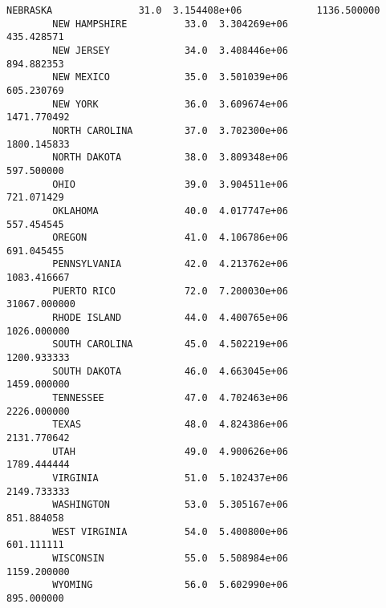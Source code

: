 \documentclass[11pt]{article}
\begin{document}
\begin{Verbatim}[commandchars=\\\{\}]
        NEBRASKA               31.0  3.154408e+06             1136.500000   
        NEW HAMPSHIRE          33.0  3.304269e+06              435.428571   
        NEW JERSEY             34.0  3.408446e+06              894.882353   
        NEW MEXICO             35.0  3.501039e+06              605.230769   
        NEW YORK               36.0  3.609674e+06             1471.770492   
        NORTH CAROLINA         37.0  3.702300e+06             1800.145833   
        NORTH DAKOTA           38.0  3.809348e+06              597.500000   
        OHIO                   39.0  3.904511e+06              721.071429   
        OKLAHOMA               40.0  4.017747e+06              557.454545   
        OREGON                 41.0  4.106786e+06              691.045455   
        PENNSYLVANIA           42.0  4.213762e+06             1083.416667   
        PUERTO RICO            72.0  7.200030e+06            31067.000000   
        RHODE ISLAND           44.0  4.400765e+06             1026.000000   
        SOUTH CAROLINA         45.0  4.502219e+06             1200.933333   
        SOUTH DAKOTA           46.0  4.663045e+06             1459.000000   
        TENNESSEE              47.0  4.702463e+06             2226.000000   
        TEXAS                  48.0  4.824386e+06             2131.770642   
        UTAH                   49.0  4.900626e+06             1789.444444   
        VIRGINIA               51.0  5.102437e+06             2149.733333   
        WASHINGTON             53.0  5.305167e+06              851.884058   
        WEST VIRGINIA          54.0  5.400800e+06              601.111111   
        WISCONSIN              55.0  5.508984e+06             1159.200000   
        WYOMING                56.0  5.602990e+06              895.000000   
        

\end{Verbatim}
\end{document}
